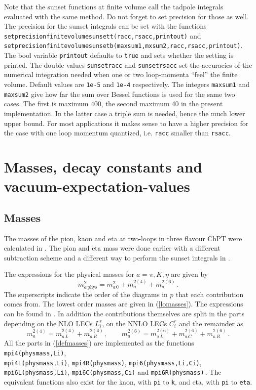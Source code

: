 \documentclass[12pt,a4paper]{article}
\begin{document}
Note that the sunset functions at finite volume call the tadpole integrals
evaluated with the same method. Do not forget to set precision for those
as well.
The precision for the sunset integrals can be set with the
functions  
\texttt{setprecisionfinitevolumesunsett(racc,rsacc,printout)}
and \texttt{setprecisionfinitevolumesunsetb(maxsum1,mxsum2,racc,rsacc,printout)}.
The bool variable \texttt{printout} defaults to \texttt{true}
and sets whether the setting is
printed. The double values \texttt{sunsetracc} and \texttt{sunsetrsacc}
set the accuracies
of the numerical integration needed when one or two loop-momenta ``feel''
the finite volume. Default values are \texttt{1e-5} and \texttt{1e-4}
respectively.
The integers \texttt{maxsum1} and \texttt{maxsum2} give how far the sum over
Bessel functions
is used for the same two cases. The first is maximum 400,
the second maximum 40 in the present implementation.
In the latter case a triple sum is needed, hence the much lower upper bound.
For most applications it makes sense to have a higher precision for
the case with one loop momentum quantized, i.e. \texttt{racc} smaller than
\texttt{rsacc}.

\section{Masses, decay constants and vacuum-expectation-values}
\label{massdecayvev}

\subsection{Masses}

The masses of the pion, kaon and eta at two-loops in three flavour ChPT
were calculated in \cite{Amoros:1999dp}. The pion and eta mass were done earlier
with a different subtraction scheme and a different way to perform the
sunset integrals in \cite{Golowich:1997zs}.

The expressions for the physical masses for $a=\pi,K,\eta$ are given by
\begin{equation}
m_{a\,\mathrm{phys}}^2 = m_{a\,0}^2+m_a^{2(4)}+m_a^{2(6)}\,.
\end{equation}
The superscripts indicate the order of the diagrams in $p$ that each
contribution comes from. 
The lowest order masses are given in (\ref{lomasses}).
The expressions can be found in \cite{Amoros:1999dp}.
In addition the contributions themselves are split in the parts
depending on the NLO LECs $L_i^r$, on the NNLO LECs $C_i^r$ and the
remainder as
\begin{equation}
\label{defmasses}
m_a^{2(4)}=m_{a\,L}^{2(4)}+m_{a\,R}^{2(4)}\,,
\qquad
m_a^{2(6)}=m_{a\,L}^{2(6)}+m_{a\,C}^{2(6)}+m_{a\,R}^{2(6)}\,.
\end{equation}
All the parts in (\ref{defmasses}) are implemented as the functions
\texttt{mpi4(physmass,Li)},\\ \texttt{mpi4L(physmass,Li)}, 
\texttt{mpi4R(physmass)}, \texttt{mpi6(physmass,Li,Ci)},
\texttt{mpi6L(physmass,Li)}, \texttt{mpi6C(physmass,Ci)}
and \texttt{mpi6R(physmass)}\,. The equivalent functions also exist 
for the kaon, with \texttt{pi} to \texttt{k}, and eta,
with \texttt{pi} to \texttt{eta}.
\end{document}

